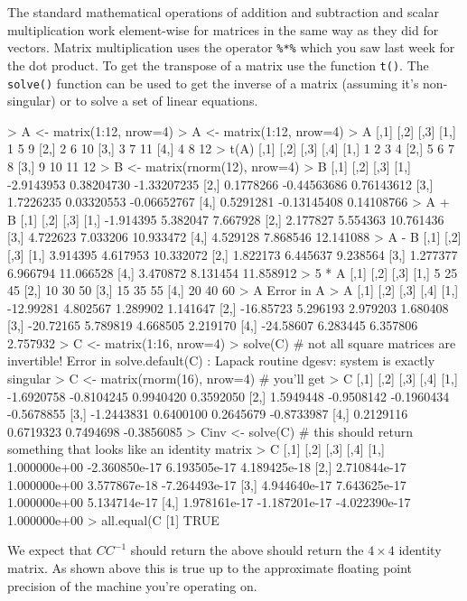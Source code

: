 The standard mathematical operations of addition and subtraction and
scalar multiplication work element-wise for matrices in the same way as
they did for vectors. Matrix multiplication uses the operator
\lstinline!%*%! which you saw last week for the dot product. To get the
transpose of a matrix use the function \lstinline!t()!. The
\lstinline!solve()! function can be used to get the inverse of a matrix
(assuming it's non-singular) or to solve a set of linear equations.

\begin{R}
> A <- matrix(1:12, nrow=4)
> A <- matrix(1:12, nrow=4)
> A
     [,1] [,2] [,3]
[1,]    1    5    9
[2,]    2    6   10
[3,]    3    7   11
[4,]    4    8   12
> t(A)
     [,1] [,2] [,3] [,4]
[1,]    1    2    3    4
[2,]    5    6    7    8
[3,]    9   10   11   12
> B <- matrix(rnorm(12), nrow=4)
> B
           [,1]        [,2]        [,3]
[1,] -2.9143953  0.38204730 -1.33207235
[2,]  0.1778266 -0.44563686  0.76143612
[3,]  1.7226235  0.03320553 -0.06652767
[4,]  0.5291281 -0.13145408  0.14108766
> A + B
          [,1]     [,2]      [,3]
[1,] -1.914395 5.382047  7.667928
[2,]  2.177827 5.554363 10.761436
[3,]  4.722623 7.033206 10.933472
[4,]  4.529128 7.868546 12.141088
> A - B
         [,1]     [,2]      [,3]
[1,] 3.914395 4.617953 10.332072
[2,] 1.822173 6.445637  9.238564
[3,] 1.277377 6.966794 11.066528
[4,] 3.470872 8.131454 11.858912
> 5 * A
     [,1] [,2] [,3]
[1,]    5   25   45
[2,]   10   30   50
[3,]   15   35   55
[4,]   20   40   60
> A %
Error in A %
> A %
          [,1]     [,2]     [,3]     [,4]
[1,] -12.99281 4.802567 1.289902 1.141647
[2,] -16.85723 5.296193 2.979203 1.680408
[3,] -20.72165 5.789819 4.668505 2.219170
[4,] -24.58607 6.283445 6.357806 2.757932
> C <- matrix(1:16, nrow=4)
> solve(C)  # not all square matrices are invertible!
Error in solve.default(C) : Lapack routine dgesv: system is exactly singular
> C <- matrix(rnorm(16), nrow=4)  # you'll get
> C
           [,1]       [,2]       [,3]       [,4]
[1,] -1.6920758 -0.8104245  0.9940420  0.3592050
[2,]  1.5949448 -0.9508142 -0.1960434 -0.5678855
[3,] -1.2443831  0.6400100  0.2645679 -0.8733987
[4,]  0.2129116  0.6719323  0.7494698 -0.3856085
> Cinv <- solve(C)  # this should return something that looks like an identity matrix
> C %
             [,1]          [,2]          [,3]          [,4]
[1,] 1.000000e+00 -2.360850e-17  6.193505e-17  4.189425e-18
[2,] 2.710844e-17  1.000000e+00  3.577867e-18 -7.264493e-17
[3,] 4.944640e-17  7.643625e-17  1.000000e+00  5.134714e-17
[4,] 1.978161e-17 -1.187201e-17 -4.022390e-17  1.000000e+00
> all.equal(C %
[1] TRUE
\end{R}


We expect that $CC^{-1}$ should return the above should return the
$4 \times 4$ identity matrix. As shown above this is true up to the
approximate floating point precision of the machine you're operating on.



